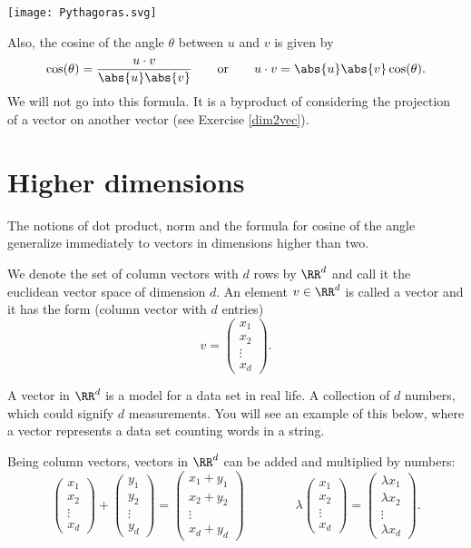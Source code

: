 \documentclass{article}
\begin{document}
\texttt{[image: Pythagoras.svg]}


Also, the cosine of the angle $\theta$ between $u$ and $v$ is given by
$$
\cos(\theta) = \frac{u\cdot v}{\abs{u}\abs{v}}\qquad\text{or}\qquad u \cdot v = \abs{u} \abs{v} \cos(\theta).
$$
We will not go into this formula. It is a byproduct of considering the projection of a vector on
another vector (see Exercise \ref{dim2vec}).

\section{Higher dimensions}

The notions of dot product, norm and the formula for cosine of the
angle generalize immediately to vectors in dimensions
higher than two.

We denote the set of column vectors with $d$ rows
by $\RR^d$ and call it the euclidean vector space of
dimension $d$. An element $v\in \RR^d$ is called a vector and it has
the form (column vector with $d$ entries)
$$
v =
\begin{pmatrix}
  x_1 \\
  x_2 \\
  \vdots
  \\
  x_d
\end{pmatrix}.
$$

A vector in $\RR^d$ is a model for a data set in real life. A collection
of $d$ numbers, which could signify $d$ measurements. You will see
an example of this below, where a vector represents a data set
counting words in a string.

Being column vectors, vectors in $\RR^d$ can be added and multiplied by
numbers:
$$
\begin{pmatrix}
  x_1 \\
  x_2 \\
  \vdots
  \\
  x_d
\end{pmatrix} + 
\begin{pmatrix}
  y_1 \\
  y_2 \\
  \vdots
  \\
  y_d
\end{pmatrix}
=
\begin{pmatrix}
  x_1 + y_1 \\
  x_2 + y_2\\
  \vdots
  \\
  x_d + y_d
\end{pmatrix}\qquad\qquad
\lambda
\begin{pmatrix}
  x_1 \\
  x_2 \\
  \vdots
  \\
  x_d
\end{pmatrix} =
\begin{pmatrix}
  \lambda x_1 \\
  \lambda x_2 \\
  \vdots
  \\
  \lambda x_d
\end{pmatrix}.
$$
\end{document}
